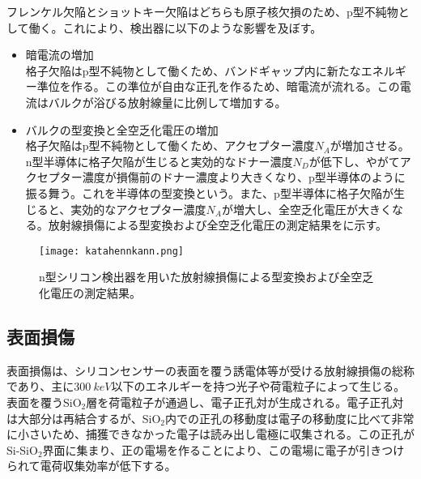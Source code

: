 フレンケル欠陥とショットキー欠陥はどちらも原子核欠損のため、p型不純物として働く。これにより、検出器に以下のような影響を及ぼす。
\begin{itemize}
  \item 暗電流の増加\\
  格子欠陥はp型不純物として働くため、バンドギャップ内に新たなエネルギー準位を作る。この準位が自由な正孔を作るため、暗電流が流れる。この電流はバルクが浴びる放射線量に比例して増加する。
  \item バルクの型変換と全空乏化電圧の増加\\
  格子欠陥はp型不純物として働くため、アクセプター濃度$N_A$が増加させる。n型半導体に格子欠陥が生じると実効的なドナー濃度$N_D$が低下し、やがてアクセプター濃度が損傷前のドナー濃度より大きくなり、p型半導体のように振る舞う。これを半導体の型変換という。また、p型半導体に格子欠陥が生じると、実効的なアクセプター濃度$N_A$が増大し、全空乏化電圧が大きくなる。放射線損傷による型変換および全空乏化電圧の測定結果をに示す。
\end{itemize}
\begin{figure}[tbp]
  \centering
  \texttt{[image: katahennkann.png]}
  \caption[放射線損傷による型変換および全空乏化電圧の測定結果]{n型シリコン検出器を用いた放射線損傷による型変換および全空乏化電圧の測定結果\cite{typeinversion}。}
  \label{fig:katahennkann}
\end{figure}



\subsection{表面損傷}
\label{sec:hyoumen}
表面損傷は、シリコンセンサーの表面を覆う誘電体等が受ける放射線損傷の総称であり、主に$300\ \si{keV}$以下のエネルギーを持つ光子や荷電粒子によって生じる。表面を覆うSiO$_2$層を荷電粒子が通過し、電子正孔対が生成される。電子正孔対は大部分は再結合するが、SiO$_2$内での正孔の移動度は電子の移動度に比べて非常に小さいため、捕獲できなかった電子は読み出し電極に収集される。この正孔がSi-SiO$_2$界面に集まり、正の電場を作ることにより、この電場に電子が引きつけられて電荷収集効率が低下する。



